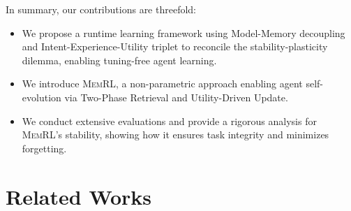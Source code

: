 \documentclass{article}
\theoremstyle{plain}
\theoremstyle{definition}
\theoremstyle{remark}
\begin{document}
In summary, our contributions are threefold:
\begin{itemize}
    \item We propose a runtime learning framework using Model-Memory decoupling and Intent-Experience-Utility triplet to reconcile the stability-plasticity dilemma, enabling tuning-free agent learning.
\item We introduce \textsc{MemRL}, a non-parametric approach enabling agent self-evolution via Two-Phase Retrieval and Utility-Driven Update.
    \item We conduct extensive evaluations and provide a rigorous analysis for \textsc{MemRL}’s stability, showing how it ensures task integrity and minimizes forgetting.
\end{itemize}



\section{Related Works}
\end{document}
